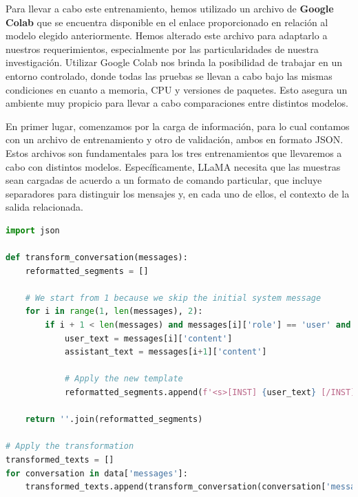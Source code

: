 \bigskip %
Para llevar a cabo este entrenamiento, hemos utilizado un archivo de \textbf{Google Colab} \cite{GoogleColab}  que se encuentra disponible en el enlace proporcionado en relación al modelo elegido anteriormente. Hemos alterado este archivo para adaptarlo a nuestros requerimientos, especialmente por las particularidades de nuestra investigación. Utilizar Google Colab nos brinda la posibilidad de trabajar en un entorno controlado, donde todas las pruebas se llevan a cabo bajo las mismas condiciones en cuanto a memoria, \acrshort{CPU} y versiones de paquetes. Esto asegura un ambiente muy propicio para llevar a cabo comparaciones entre distintos modelos.

\newpage
En primer lugar, comenzamos por la carga de información, para lo cual contamos con un archivo de entrenamiento y otro de validación, ambos en formato \acrshort{JSON}. Estos archivos son fundamentales para los tres entrenamientos que llevaremos a cabo con distintos modelos. Específicamente, \acrshort{LLaMA}  necesita que las muestras sean cargadas de acuerdo a un formato de comando particular, que incluye separadores para distinguir los mensajes y, en cada uno de ellos, el contexto de la salida relacionada.
\bigskip %

\begin{lstlisting}[language=Python, caption={Conversión JSON a TXT.}, label=listado3]
import json

def transform_conversation(messages):
    reformatted_segments = []

    # We start from 1 because we skip the initial system message
    for i in range(1, len(messages), 2):
        if i + 1 < len(messages) and messages[i]['role'] == 'user' and messages[i+1]['role'] == 'assistant':
            user_text = messages[i]['content']
            assistant_text = messages[i+1]['content']

            # Apply the new template
            reformatted_segments.append(f'<s>[INST] {user_text} [/INST] {assistant_text} </s>')

    return ''.join(reformatted_segments)

# Apply the transformation
transformed_texts = []
for conversation in data['messages']:
    transformed_texts.append(transform_conversation(conversation['messages']))

\end{lstlisting}

\bigskip %

